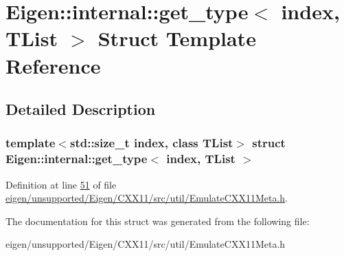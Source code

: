 \hypertarget{struct_eigen_1_1internal_1_1get__type}{}\section{Eigen\+:\+:internal\+:\+:get\+\_\+type$<$ index, T\+List $>$ Struct Template Reference}
\label{struct_eigen_1_1internal_1_1get__type}


\subsection{Detailed Description}
\subsubsection*{template$<$std\+::size\+\_\+t index, class T\+List$>$\newline
struct Eigen\+::internal\+::get\+\_\+type$<$ index, T\+List $>$}



Definition at line \hyperlink{eigen_2unsupported_2_eigen_2_c_x_x11_2src_2util_2_emulate_c_x_x11_meta_8h_source_l00051}{51} of file \hyperlink{eigen_2unsupported_2_eigen_2_c_x_x11_2src_2util_2_emulate_c_x_x11_meta_8h_source}{eigen/unsupported/\+Eigen/\+C\+X\+X11/src/util/\+Emulate\+C\+X\+X11\+Meta.\+h}.



The documentation for this struct was generated from the following file\+:\begin{DoxyCompactItemize}
\item 
eigen/unsupported/\+Eigen/\+C\+X\+X11/src/util/\+Emulate\+C\+X\+X11\+Meta.\+h\end{DoxyCompactItemize}
